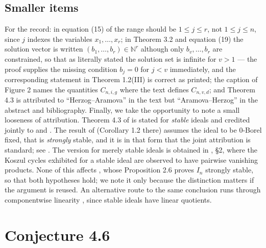 \documentclass[a4paper,11pt,oneside,reqno]{amsart}
\theoremstyle{definition}
\theoremstyle{remark}
\theoremstyle{plain}
\newcommand{\NN}{\mathbb{N}}
\begin{document}
\subsection{Smaller items}

For the record: in equation (15) of \cite{Snellman2000} the range should be
\(1 \le j \le r\), not \(1 \le j \le n\), since \(j\) indexes the variables
\(x_1,\dots,x_r\); in Theorem 3.2 and equation (19) the solution vector is
written \((b_1,\dots,b_r) \in \NN^{r}\) although only \(b_v,\dots,b_r\) are
constrained, so that as literally stated the solution set is infinite for
\(v > 1\) --- the proof supplies the missing condition \(b_j = 0\) for \(j < v\)
immediately, and the corresponding statement in Theorem 1.2(III) is correct as
printed; the caption of Figure 2 names the quantities \(C_{n,i,g}\) where the
text defines \(C_{n,v,d}\); and Theorem 4.3 is attributed to
``Herzog--Aramova'' in the text but ``Aramova--Herzog'' in the abstract and
bibliography. Finally, we take the opportunity to note a small looseness of
attribution. Theorem 4.3 of \cite{Snellman2000} is stated for \emph{stable}
ideals and credited jointly to \cite{AramovaHerzog} and \cite{Peeva}. The
result of \cite{Peeva} (Corollary 1.2 there) assumes the ideal to be
\(0\)-Borel fixed, that is \emph{strongly} stable, and it is in that form that
the joint attribution is standard; see \cite[Thm.~6.16(6)]{McCulloughPeeva}.
The version for merely stable ideals is obtained in \cite{AramovaHerzog},
\S2, where the Koszul cycles exhibited for a stable ideal are observed to have
pairwise vanishing products. None of this affects \cite{Snellman2000}, whose
Proposition 2.6 proves \(I_n\) strongly stable, so that both hypotheses hold;
we note it only because the distinction matters if the argument is reused. An
alternative route to the same conclusion runs through componentwise linearity
\cite{HerzogReinerWelker}, since stable ideals have linear quotients.

\section{Conjecture 4.6}\label{sec:conjecture}
\end{document}
